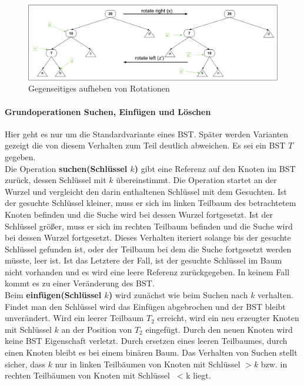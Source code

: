 \documentclass[a4paper,12pt]{article}
\begin{document}
\begin{figure}[h]
	\centering
	\includegraphics[width= 1.2\textwidth]{"Medien/Einleitung/LinksRechtsRotation"}
	\caption{Gegenseitiges aufheben von Rotationen}
	\label{fig:LinksRechtsRotation}
\end{figure}

\paragraph{Grundoperationen Suchen, Einfügen und Löschen} \label{BST Operationen}
Hier geht es nur um die Standardvariante eines BST. Später werden Varianten gezeigt die von diesem Verhalten zum Teil deutlich abweichen. Es sei ein BST $T$ gegeben.\\
  Die Operation \textbf{suchen(Schlüssel $k$)} gibt eine Referenz auf den Knoten im BST zurück, dessen Schlüssel mit $k$ übereinstimmt. Die Operation startet an der Wurzel und vergleicht den darin enthaltenen Schlüssel mit dem Gesuchten. Ist der gesuchte Schlüssel kleiner, muss er sich im linken Teilbaum des betrachtetem Knoten befinden und die Suche wird bei dessen Wurzel fortgesetzt. Ist der Schlüssel größer, muss er sich im rechten Teilbaum befinden und die Suche wird bei dessen Wurzel fortgesetzt. Dieses Verhalten iteriert solange bis der gesuchte Schlüssel gefunden ist, oder der Teilbaum bei dem die Suche fortgesetzt werden müsste, leer ist. Ist das Letztere der Fall, ist der gesuchte Schlüssel im Baum nicht vorhanden und es wird eine leere Referenz zurückgegeben. In keinem Fall kommt es zu einer Veränderung des BST.\\
  Beim \textbf{einfügen(Schlüssel $k$)} wird zunächst wie beim Suchen nach $k$ verhalten. Findet man den Schlüssel wird das Einfügen abgebrochen und der BST bleibt unverändert. Wird ein leerer Teilbaum $T_2$ erreicht, wird ein neu erzeugter Knoten mit Schlüssel $k$ an der Position von $T_2$ eingefügt. Durch den neuen Knoten wird keine BST Eigenschaft verletzt. Durch ersetzen eines leeren Teilbaumes, durch einen Knoten bleibt es bei einem binären Baum. Das Verhalten von Suchen stellt sicher, dass $k$ nur in linken Teilbäumen von Knoten mit Schlüssel $> k$ bzw. in rechten Teilbäumen von Knoten mit Schlüssel~ < k liegt.    \\
\end{document}
